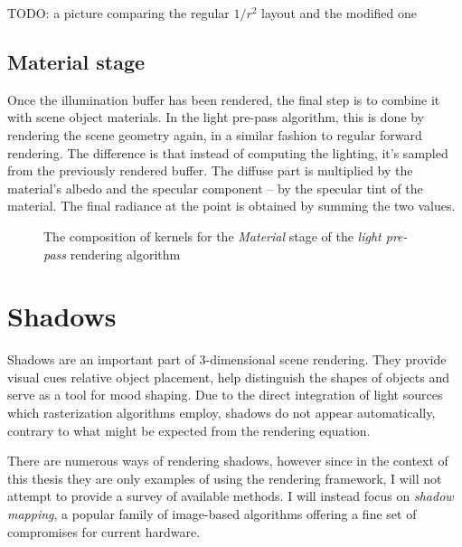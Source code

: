 TODO: a picture comparing the regular $1/r^2$ layout and the modified one

\subsection{Material stage}

Once the illumination buffer has been rendered, the final step is to combine it with scene object materials. In the light pre-pass algorithm, this is done by rendering the scene geometry again, in a similar fashion to regular forward rendering. The difference is that instead of computing the lighting, it's sampled from the previously rendered buffer. The diffuse part is multiplied by the material's albedo and the specular component -- by the specular tint of the material. The final radiance at the point is obtained by summing the two values.

\begin{figure}[h!]
  \centering
    \caption[Light Pre-Pass Stage 3]{The composition of kernels for the \emph{Material} stage of the  \emph{light pre-pass} rendering algorithm}
  \label{fig:DeferredLightingStage3}
\end{figure}

\clearpage
\section{Shadows}

Shadows are an important part of 3-dimensional scene rendering. They provide visual cues relative object placement, help distinguish the shapes of objects and serve as a tool for mood shaping. Due to the direct integration of light sources which rasterization algorithms employ, shadows do not appear automatically, contrary to what might be expected from the rendering equation.

There are numerous ways of rendering shadows, however since in the context of this thesis they are only examples of using the rendering framework, I will not attempt to provide a survey of available methods. I will instead focus on \emph{shadow mapping}, a popular family of image-based algorithms offering a fine set of compromises for current hardware.

